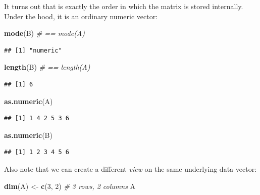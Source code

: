 \documentclass[10pt,b5paper,krantz1]{krantz}
\newenvironment{Shaded}{\begin{snugshade}}{\end{snugshade}}
\newcommand{\CommentTok}[1]{\textcolor[rgb]{0.37,0.37,0.37}{\textit{#1}}}
\newcommand{\DecValTok}[1]{\textcolor[rgb]{0.06,0.06,0.06}{#1}}
\newcommand{\KeywordTok}[1]{\textcolor[rgb]{0.27,0.27,0.27}{\textbf{#1}}}
\newcommand{\NormalTok}[1]{#1}
\newcommand{\StringTok}[1]{\textcolor[rgb]{0.5,0.5,0.5}{#1}}
\begin{document}
It turns out that is exactly the order in which the matrix is stored internally.
Under the hood, it is an ordinary numeric vector:

\begin{Shaded}
\begin{Highlighting}[]
\KeywordTok{mode}\NormalTok{(B)    }\CommentTok{# == mode(A)}
\end{Highlighting}
\end{Shaded}

\begin{verbatim}
## [1] "numeric"
\end{verbatim}

\begin{Shaded}
\begin{Highlighting}[]
\KeywordTok{length}\NormalTok{(B)  }\CommentTok{# == length(A)}
\end{Highlighting}
\end{Shaded}

\begin{verbatim}
## [1] 6
\end{verbatim}

\begin{Shaded}
\begin{Highlighting}[]
\KeywordTok{as.numeric}\NormalTok{(A)}
\end{Highlighting}
\end{Shaded}

\begin{verbatim}
## [1] 1 4 2 5 3 6
\end{verbatim}

\begin{Shaded}
\begin{Highlighting}[]
\KeywordTok{as.numeric}\NormalTok{(B)}
\end{Highlighting}
\end{Shaded}

\begin{verbatim}
## [1] 1 2 3 4 5 6
\end{verbatim}

Also note that we can create a different \emph{view} on the same underlying
data vector:

\begin{Shaded}
\begin{Highlighting}[]
\KeywordTok{dim}\NormalTok{(A) <-}\StringTok{ }\KeywordTok{c}\NormalTok{(}\DecValTok{3}\NormalTok{, }\DecValTok{2}\NormalTok{) }\CommentTok{# 3 rows, 2 columns}
\NormalTok{A}
\end{Highlighting}
\end{Shaded}
\end{document}
